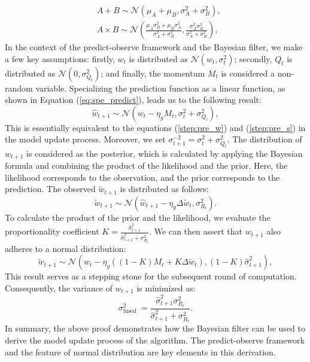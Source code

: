 \begin{align}
   &A+B \sim \mathcal{N}\left(\mu_A+\mu_B, \sigma_A^2+\sigma_B^2\right),\\
   &A\times B \sim \mathcal{N}\left(\frac{\mu_A \sigma_B^2+\mu_B \sigma_A^2}{\sigma_A^2+\sigma_B^2}, \frac{\sigma_A^2 \sigma_B^2}{\sigma_A^2+\sigma_B^2}\right),
\end{align} 
In the context of the predict-observe framework and the Bayesian filter, we make a few key assumptions: firstly, $w_t$ is distributed as $\mathcal{N}\left(w_t, \sigma_t^{2}\right)$; secondly, $Q_t$ is distributed as $\mathcal{N}\left(0, \sigma_{Q_t}^2\right)$; and finally, the momentum $M_t$ is considered a non-random variable. Specializing the prediction function as a linear function, as shown in Equation (\ref{eq:spe_predict}), leads us to the following result:
\begin{equation}
\hat{w}_{t+1} \sim \mathcal{N}\left(w_t-\eta_g M_t, \sigma_t^{2}+\sigma_{Q_t}^2\right),
\end{equation}
This is essentially equivalent to the equations (\ref{step:pre_w}) and (\ref{step:pre_s}) in the model update process. Moreover, we set $\sigma_{t+1}^{-2}=\sigma_t^{2}+\sigma_{Q_t}^2$.
The distribution of $w_{t+1}$ is considered as the posterior, which is calculated by applying the Bayesian formula and combining the product of the likelihood and the prior. Here, the likelihood corresponds to the observation, and the prior corresponds to the prediction.
The observed $\tilde{w}_{t+1}$ is distributed as follows:
\begin{equation}
\tilde{w}_{t+1} \sim \mathcal{N}\left(\hat{w}_{t+1}-\eta_g \Delta \tilde{w}_{t},\sigma_{R_t}^2\right).
\end{equation}
To calculate the product of the prior and the likelihood, we evaluate the proportionality coefficient $K=\frac{\hat{\sigma}^2_{t+1}}{\hat{\sigma}^2_{t+1}+\sigma_{R_t}^2}$. We can then assert that $w_{t+1}$ also adheres to a normal distribution:
\begin{equation}
\tilde{w}_{t+1} \sim \mathcal{N}\left(w_t-\eta_g ((1-K)M_t+K\Delta \tilde{w}_{t}),(1-K)\hat{\sigma}^2_{t+1}\right),
\end{equation}
This result serves as a stepping stone for the subsequent round of computation. Consequently, the variance of $w_{t+1}$ is minimized as:
\begin{equation}
\sigma_{\text {fused }}^2=\frac{\hat{\sigma}^2_{t+1} \sigma_{R_t}^2}{\hat{\sigma}^2_{t+1}+\sigma_{R_t}^2}.
\end{equation}
In summary, the above proof demonstrates how the Bayesian filter can be used to derive the model update process of the \fedeve algorithm. The predict-observe framework and the feature of normal distribution are key elements in this derivation.

